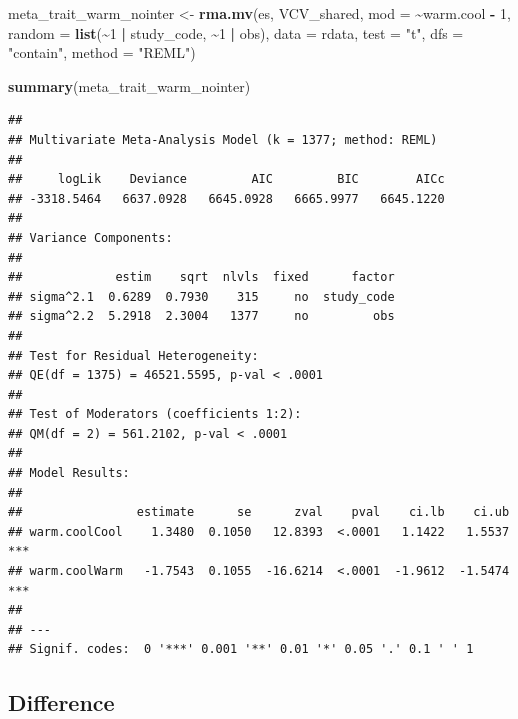 \documentclass[
]{article}
\newenvironment{Shaded}{\begin{snugshade}}{\end{snugshade}}
\newcommand{\AttributeTok}[1]{\textcolor[rgb]{0.13,0.29,0.53}{#1}}
\newcommand{\DecValTok}[1]{\textcolor[rgb]{0.00,0.00,0.81}{#1}}
\newcommand{\FunctionTok}[1]{\textcolor[rgb]{0.13,0.29,0.53}{\textbf{#1}}}
\newcommand{\NormalTok}[1]{#1}
\newcommand{\OtherTok}[1]{\textcolor[rgb]{0.56,0.35,0.01}{#1}}
\newcommand{\SpecialCharTok}[1]{\textcolor[rgb]{0.81,0.36,0.00}{\textbf{#1}}}
\newcommand{\StringTok}[1]{\textcolor[rgb]{0.31,0.60,0.02}{#1}}
\begin{document}
\begin{Shaded}
\begin{Highlighting}[]
\NormalTok{meta\_trait\_warm\_nointer }\OtherTok{\textless{}{-}} \FunctionTok{rma.mv}\NormalTok{(es, VCV\_shared, }\AttributeTok{mod =} \SpecialCharTok{\textasciitilde{}}\NormalTok{warm.cool }\SpecialCharTok{{-}}
    \DecValTok{1}\NormalTok{, }\AttributeTok{random =} \FunctionTok{list}\NormalTok{(}\SpecialCharTok{\textasciitilde{}}\DecValTok{1} \SpecialCharTok{|}\NormalTok{ study\_code, }\SpecialCharTok{\textasciitilde{}}\DecValTok{1} \SpecialCharTok{|}\NormalTok{ obs), }\AttributeTok{data =}\NormalTok{ rdata,}
    \AttributeTok{test =} \StringTok{"t"}\NormalTok{, }\AttributeTok{dfs =} \StringTok{"contain"}\NormalTok{, }\AttributeTok{method =} \StringTok{"REML"}\NormalTok{)}
\end{Highlighting}
\end{Shaded}

\begin{Shaded}
\begin{Highlighting}[]
\FunctionTok{summary}\NormalTok{(meta\_trait\_warm\_nointer)}
\end{Highlighting}
\end{Shaded}

\begin{verbatim}
## 
## Multivariate Meta-Analysis Model (k = 1377; method: REML)
## 
##     logLik    Deviance         AIC         BIC        AICc   
## -3318.5464   6637.0928   6645.0928   6665.9977   6645.1220   
## 
## Variance Components:
## 
##             estim    sqrt  nlvls  fixed      factor 
## sigma^2.1  0.6289  0.7930    315     no  study_code 
## sigma^2.2  5.2918  2.3004   1377     no         obs 
## 
## Test for Residual Heterogeneity:
## QE(df = 1375) = 46521.5595, p-val < .0001
## 
## Test of Moderators (coefficients 1:2):
## QM(df = 2) = 561.2102, p-val < .0001
## 
## Model Results:
## 
##                estimate      se      zval    pval    ci.lb    ci.ub      
## warm.coolCool    1.3480  0.1050   12.8393  <.0001   1.1422   1.5537  *** 
## warm.coolWarm   -1.7543  0.1055  -16.6214  <.0001  -1.9612  -1.5474  *** 
## 
## ---
## Signif. codes:  0 '***' 0.001 '**' 0.01 '*' 0.05 '.' 0.1 ' ' 1
\end{verbatim}

\newpage

\hypertarget{difference}{%
\subsection{Difference}\label{difference}}
\end{document}
